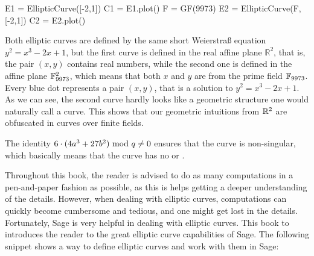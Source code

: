 \medskip

\begin{sagesilent}
E1 = EllipticCurve([-2,1])
C1 = E1.plot()
F = GF(9973)
E2 = EllipticCurve(F, [-2,1])
C2 = E2.plot()
\end{sagesilent}
\begin{minipage}{0.48\textwidth}
\end{minipage}
%
\begin{minipage}{0.48\textwidth}
\end{minipage}

Both elliptic curves are defined by the same short Weierstraß equation $y^2 = x^3-2x+1$, but the first curve is defined in the real affine plane $\mathbb{R}^2$, that is, the pair $(x,y)$ contains real numbers, while the second one is defined in the affine plane $\mathbb{F}_{9973}^2$, which means that both $x$ and $y$ are from the prime field $\mathbb{F}_{9973}$. Every blue dot represents a pair $(x,y)$, that is a solution to $y^2 = x^3-2x+1$. As we can see, the second curve hardly looks like a geometric structure one would naturally call a curve. This shows that our geometric intuitions from $\mathbb{R}^2$ are obfuscated in curves over finite fields.

The identity $6\cdot(4a^3+ 27b^2) \text{ mod } q\neq 0$ ensures that the curve is  non-singular, which basically means that the curve has no  or .

Throughout this book, the reader is advised to do as many computations in a pen-and-paper fashion as possible, as this is helps getting a deeper understanding of the details. However, when dealing with elliptic curves, computations can quickly become cumbersome and tedious, and one might get lost in the details. Fortunately, Sage is very helpful in dealing with elliptic curves. This book to introduces the reader to the great elliptic curve capabilities of Sage. The following snippet shows a way to define elliptic curves and work with them in Sage:

